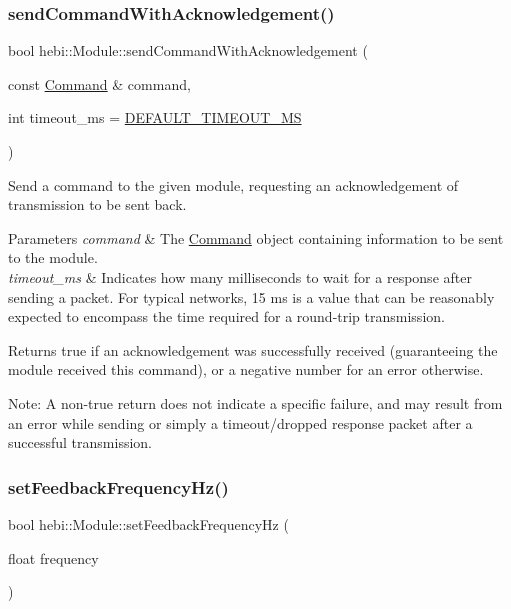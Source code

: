 \subsubsection{\texorpdfstring{send\+Command\+With\+Acknowledgement()}{sendCommandWithAcknowledgement()}}
{\footnotesize\ttfamily bool hebi\+::\+Module\+::send\+Command\+With\+Acknowledgement (\begin{DoxyParamCaption}\item[{const \hyperlink{classhebi_1_1Command}{Command} \&}]{command,  }\item[{int}]{timeout\+\_\+ms = {\ttfamily \hyperlink{classhebi_1_1Module_afba0d28ff83c8ddabd8f6490e412c821}{D\+E\+F\+A\+U\+L\+T\+\_\+\+T\+I\+M\+E\+O\+U\+T\+\_\+\+MS}} }\end{DoxyParamCaption})}



Send a command to the given module, requesting an acknowledgement of transmission to be sent back. 


\begin{DoxyParams}{Parameters}
{\em command} & The \hyperlink{classhebi_1_1Command}{Command} object containing information to be sent to the module. \\
\hline
{\em timeout\+\_\+ms} & Indicates how many milliseconds to wait for a response after sending a packet. For typical networks, \textquotesingle{}15\textquotesingle{} ms is a value that can be reasonably expected to encompass the time required for a round-\/trip transmission.\\
\hline
\end{DoxyParams}
\begin{DoxyReturn}{Returns}
true if an acknowledgement was successfully received (guaranteeing the module received this command), or a negative number for an error otherwise.
\end{DoxyReturn}
Note\+: A non-\/true return does not indicate a specific failure, and may result from an error while sending or simply a timeout/dropped response packet after a successful transmission. \mbox{\label{classhebi_1_1Module_a2d37eac7776c910ca5d5de47cadec3e3}} 
\subsubsection{\texorpdfstring{set\+Feedback\+Frequency\+Hz()}{setFeedbackFrequencyHz()}}
{\footnotesize\ttfamily bool hebi\+::\+Module\+::set\+Feedback\+Frequency\+Hz (\begin{DoxyParamCaption}\item[{float}]{frequency }\end{DoxyParamCaption})}



